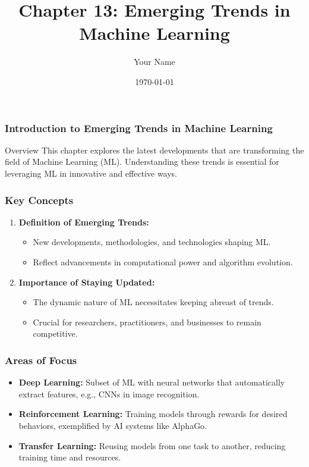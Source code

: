 \documentclass{beamer}
\title{Chapter 13: Emerging Trends in Machine Learning}
\author{Your Name}
\institute{Your Institution}
\date{\today}
\begin{document}
\frame{\titlepage}

\begin{frame}[fragile]
    \frametitle{Introduction to Emerging Trends in Machine Learning}
    \begin{block}{Overview}
        This chapter explores the latest developments that are transforming the field of Machine Learning (ML).
        Understanding these trends is essential for leveraging ML in innovative and effective ways.
    \end{block}
\end{frame}

\begin{frame}[fragile]
    \frametitle{Key Concepts}
    \begin{enumerate}
        \item \textbf{Definition of Emerging Trends:}
        \begin{itemize}
            \item New developments, methodologies, and technologies shaping ML.
            \item Reflect advancements in computational power and algorithm evolution.
        \end{itemize}
        
        \item \textbf{Importance of Staying Updated:}
        \begin{itemize}
            \item The dynamic nature of ML necessitates keeping abreast of trends.
            \item Crucial for researchers, practitioners, and businesses to remain competitive.
        \end{itemize}
    \end{enumerate}
\end{frame}

\begin{frame}[fragile]
    \frametitle{Areas of Focus}
    \begin{itemize}
        \item \textbf{Deep Learning:} Subset of ML with neural networks that automatically extract features, e.g., CNNs in image recognition.
        \item \textbf{Reinforcement Learning:} Training models through rewards for desired behaviors, exemplified by AI systems like AlphaGo.
        \item \textbf{Transfer Learning:} Reusing models from one task to another, reducing training time and resources.
    \end{itemize}
\end{frame}
\end{document}
